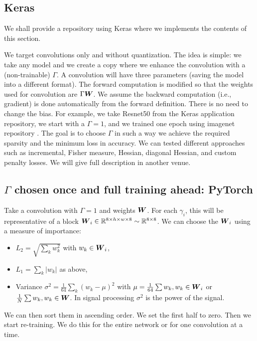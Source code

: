 \documentclass[sigconf]{acmart}
\begin{document}
\subsection{Keras}
We shall provide a repository using Keras \cite{chollet2015keras}
where we implements the contents of this section. %

We target convolutions only and without quantization. The idea is
simple: we take any model and we create a copy where we enhance the
convolution with a (non-trainable) $\Gamma$. A convolution will have
three parameters (saving the model into a different format).  The
forward computation is modified so that the weights used for
convolution are $\Gamma{\boldsymbol W}$. We assume the backward computation
(i.e., gradient) is done automatically from the forward
definition. There is no need to change the bias. For example, we take
Resnet50 from the Keras application repository, we start with a
$\Gamma=1$, and we trained one epoch using imagenet repository
\cite{deng2009imagenet}.  The goal is to choose $\Gamma$ in such a way
we achieve the required sparsity and the minimum loss in accuracy. We
can tested different approaches such as incremental, Fisher measure,
Hessian, diagonal Hessian, and custom penalty losses. We will give
full description in another venue.

\subsection{$\Gamma$ chosen once and full training ahead: PyTorch}
\label{sec:one-mask}
\label{sec:pytorch}
Take a convolution with $\Gamma = 1$ and weights ${\boldsymbol W}$. For each
$\gamma_i$, this will be representative of a block ${\boldsymbol W}_i \in \mathbb{R}^{8
  \times h \times w \times 8} \sim \mathbb{R}^{8\times 8}$. We can choose the
${\boldsymbol W}_i$ using a measure of importance:
\begin{itemize}
  \item $L_2 = \sqrt{\sum_k w_k^2}$ with $w_k \in {\boldsymbol W}_i$,
  \item $L_1 = \sum_k |w_k|$ as above,
  \item Variance $\sigma^2 = \frac{1}{64}\sum_k (w_k -\mu)^2$ with
    $\mu = \frac{1}{64}\sum w_k, w_k \in {\boldsymbol W}_i $ or $\frac{1}{N}\sum
    w_k, w_k \in {\boldsymbol W}$. In signal processing $\sigma^2$ is the power
    of the signal.
\end{itemize}
We can then sort them in ascending order. We set the first half to
zero.  Then we start re-training. We do this for the entire network or
for one convolution at a time.
\end{document}
